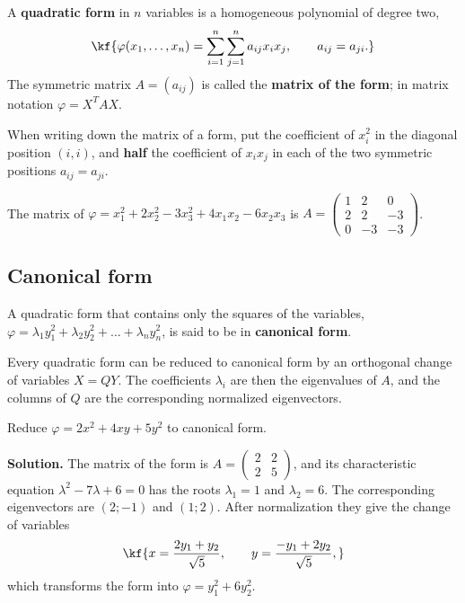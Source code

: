 
\begin{tarif}
A \textbf{quadratic form} in $n$ variables is a homogeneous polynomial of
degree two,
\[\kf{\varphi(x_1,\dots,x_n)=\sum_{i=1}^n\sum_{j=1}^n a_{ij}x_ix_j,\qquad a_{ij}=a_{ji}.}\]
The symmetric matrix $A=(a_{ij})$ is called the \textbf{matrix of the
form}; in matrix notation $\varphi=X^TAX$.
\end{tarif}

\begin{eslatma}
When writing down the matrix of a form, put the coefficient of $x_i^2$
in the diagonal position $(i,i)$, and \textbf{half} the coefficient of
$x_ix_j$ in each of the two symmetric positions $a_{ij}=a_{ji}$.
\end{eslatma}

\begin{misol}
The matrix of $\varphi=x_1^2+2x_2^2-3x_3^2+4x_1x_2-6x_2x_3$ is
$A=\begin{pmatrix}1&2&0\\2&2&-3\\0&-3&-3\end{pmatrix}$.
\end{misol}

\subsection{Canonical form}

\begin{tarif}
A quadratic form that contains only the squares of the variables,
$\varphi=\lambda_1y_1^2+\lambda_2y_2^2+\dots+\lambda_ny_n^2$, is said to
be in \textbf{canonical form}.
\end{tarif}

\begin{teorema}
Every quadratic form can be reduced to canonical form by an orthogonal
change of variables $X=QY$. The coefficients $\lambda_i$ are then the
eigenvalues of $A$, and the columns of $Q$ are the corresponding
normalized eigenvectors.
\end{teorema}

\begin{misol}
Reduce $\varphi=2x^2+4xy+5y^2$ to canonical form.

\textbf{Solution.} The matrix of the form is
$A=\begin{pmatrix}2&2\\2&5\end{pmatrix}$, and its characteristic
equation $\lambda^2-7\lambda+6=0$ has the roots $\lambda_1=1$ and
$\lambda_2=6$. The corresponding eigenvectors are $(2;-1)$ and $(1;2)$.
After normalization they give the change of variables
\[\kf{x=\frac{2y_1+y_2}{\sqrt5},\qquad y=\frac{-y_1+2y_2}{\sqrt5},}\]
which transforms the form into $\varphi=y_1^2+6y_2^2$.
\end{misol}

